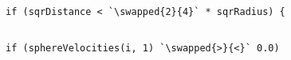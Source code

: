 \documentclass[12pt, a4paper]{article}
\newcommand{\removed}[1]{\colorbox{pink}{\vphantom{A}#1}}
\newcommand{\added}[1]{\colorbox{lime}{\vphantom{A}#1}}
\newcommand{\swapped}[2]{\removed{#1}\added{#2}}
\newcommand{\inline}[1]{\fbox{\texttt{#1}}}
\begin{document}
    \subsection{}
        \begin{lstlisting}[caption={The \inline{2} has been replaced with \inline{4}.}, label={lst:f1}]
if (sqrDistance < `\swapped{2}{4}` * sqrRadius) {
\end{lstlisting}

    \subsection{}
        \begin{lstlisting}[caption={The \inline{>} has been swapped with \inline{<}.}, label={lst:g1}]
if (sphereVelocities(i, 1) `\swapped{>}{<}` 0.0)
\end{lstlisting}
\end{document}
